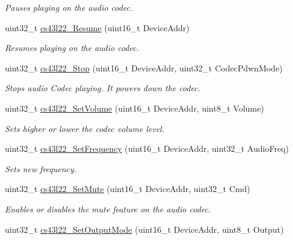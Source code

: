 \begin{DoxyCompactItemize}
\begin{DoxyCompactList}\small\item\em Pauses playing on the audio codec. \end{DoxyCompactList}\item 
uint32\+\_\+t \mbox{\hyperlink{group___c_s43_l22___private___functions_ga579c0ef6455060e9117632f8d83d606a}{cs43l22\+\_\+\+Resume}} (uint16\+\_\+t Device\+Addr)
\begin{DoxyCompactList}\small\item\em Resumes playing on the audio codec. \end{DoxyCompactList}\item 
uint32\+\_\+t \mbox{\hyperlink{group___c_s43_l22___private___functions_gabddd9aca1e7c5cdf636556cc02b4d82e}{cs43l22\+\_\+\+Stop}} (uint16\+\_\+t Device\+Addr, uint32\+\_\+t Codec\+Pdwn\+Mode)
\begin{DoxyCompactList}\small\item\em Stops audio Codec playing. It powers down the codec. \end{DoxyCompactList}\item 
uint32\+\_\+t \mbox{\hyperlink{group___c_s43_l22___private___functions_ga9cd060bb226e44065ec50c7803041114}{cs43l22\+\_\+\+Set\+Volume}} (uint16\+\_\+t Device\+Addr, uint8\+\_\+t Volume)
\begin{DoxyCompactList}\small\item\em Sets higher or lower the codec volume level. \end{DoxyCompactList}\item 
uint32\+\_\+t \mbox{\hyperlink{group___c_s43_l22___private___functions_ga1ea4920e35f5e5f903870a50b53bc719}{cs43l22\+\_\+\+Set\+Frequency}} (uint16\+\_\+t Device\+Addr, uint32\+\_\+t Audio\+Freq)
\begin{DoxyCompactList}\small\item\em Sets new frequency. \end{DoxyCompactList}\item 
uint32\+\_\+t \mbox{\hyperlink{group___c_s43_l22___private___functions_gaed17c2b64d79830afa43b5a45b159286}{cs43l22\+\_\+\+Set\+Mute}} (uint16\+\_\+t Device\+Addr, uint32\+\_\+t Cmd)
\begin{DoxyCompactList}\small\item\em Enables or disables the mute feature on the audio codec. \end{DoxyCompactList}\item 
uint32\+\_\+t \mbox{\hyperlink{group___c_s43_l22___private___functions_gaad55b2ed28b599b34f4bfe50df745f0d}{cs43l22\+\_\+\+Set\+Output\+Mode}} (uint16\+\_\+t Device\+Addr, uint8\+\_\+t Output)

\end{DoxyCompactItemize}
